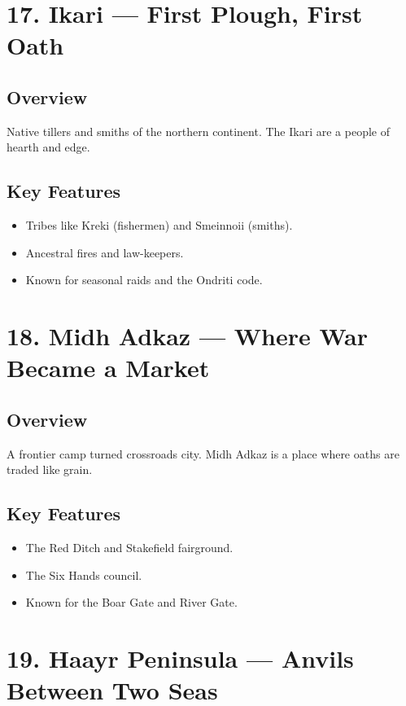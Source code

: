 \documentclass[11pt]{article}
\begin{document}
\section*{17. Ikari — First Plough, First Oath}

\subsection*{Overview}
Native tillers and smiths of the northern continent. The Ikari are a people of hearth and edge.

\subsection*{Key Features}
\begin{itemize}[leftmargin=*]
    \item Tribes like Kreki (fishermen) and Smeinnoii (smiths).
    \item Ancestral fires and law-keepers.
    \item Known for seasonal raids and the Ondriti code.
\end{itemize}

\section*{18. Midh Adkaz — Where War Became a Market}

\subsection*{Overview}
A frontier camp turned crossroads city. Midh Adkaz is a place where oaths are traded like grain.

\subsection*{Key Features}
\begin{itemize}[leftmargin=*]
    \item The Red Ditch and Stakefield fairground.
    \item The Six Hands council.
    \item Known for the Boar Gate and River Gate.
\end{itemize}

\section*{19. Haayr Peninsula — Anvils Between Two Seas}
\end{document}

